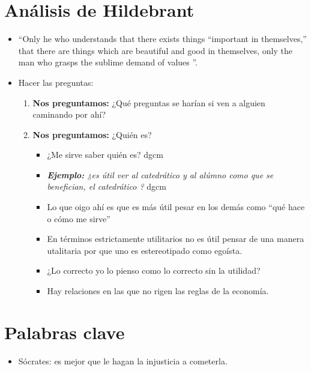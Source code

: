 \section{Análisis de Hildebrant}
\begin{itemize}
    \item ``Only he who understands that there exists things ``important in themselves,'' that there are things which are beautiful and good in themselves, only the man who grasps the sublime demand of values ''.
    \item Hacer las preguntas:
        \begin{enumerate}
            \item \textbf{Nos preguntamos:} ¿Qué preguntas se harían si ven a alguien caminando por ahí?

            \item \textbf{Nos preguntamos:} ¿Quién es? 
                \begin{itemize}
                    \item ¿Me sirve saber quién es? dgcm 
                    \item \emph{\textbf{Ejemplo: }¿es útil ver al catedrático y al alúmno como que se benefician, el catedrático ?} dgcm
                    \item Lo que oigo ahí es que es más útil pesar en los demás como ``qué hace o cómo me sirve''
                    \item En términos estrictamente utilitarios no es útil pensar de una manera utalitaria por que uno es estereotipado como egoísta.
                    \item ¿Lo correcto yo lo pienso como lo correcto sin la utilidad?
                    \item Hay relaciones en las que no rigen las reglas de la economía.
                \end{itemize}
        \end{enumerate}
\end{itemize}



\section{Palabras clave}
\begin{itemize}
    \item Sócrates: es mejor que le hagan la injusticia a cometerla.
\end{itemize}
